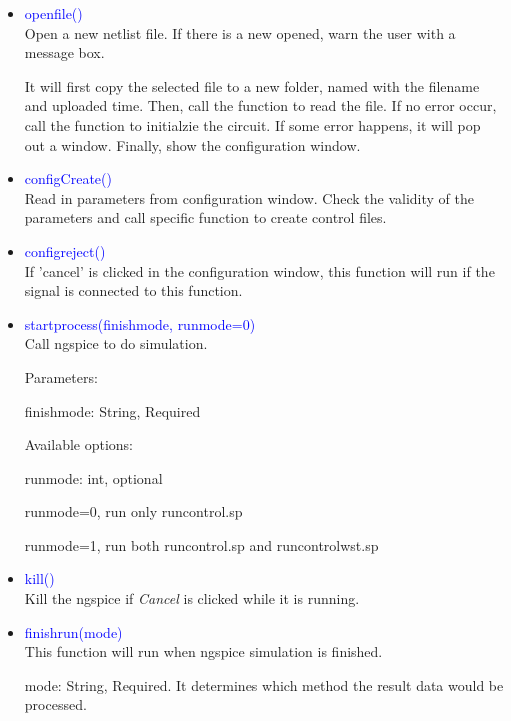 \documentclass[12pt,a4paper]{article}
\begin{document}
\begin{itemize}[leftmargin=*]
\begin{itemize}
    \item \textcolor{blue}{openfile()}\\
        Open a new netlist file. If there is a new opened, warn the user with a message box.

        It will first copy the selected file to a new folder, named with the filename and uploaded time. Then, call the function to read the file. If no error occur, call the function to initialzie the circuit. If some error happens, it will pop out a window. Finally, show the configuration window.

    \item \textcolor{blue}{configCreate()}\\
        Read in parameters from configuration window. Check the validity of the parameters and call specific function to create control files.

    \item \textcolor{blue}{configreject()}\\
        If 'cancel' is clicked in the configuration window, this function will run if the signal is connected to this function.

    \item \textcolor{blue}{start\textunderscore process(finishmode, runmode=0)}\\
        Call ngspice to do simulation.

        Parameters:

        \quad finishmode: String, Required

        \quad Available options:

        \quad runmode: int, optional

        \quad runmode=0, run only run\textunderscore control.sp

        \quad runmode=1, run both run\textunderscore control.sp and run\textunderscore control\textunderscore wst.sp

    \item \textcolor{blue}{kill()}\\
        Kill the ngspice if \textit{Cancel} is clicked while it is running.

    \item \textcolor{blue}{finishrun(mode)}\\
        This function will run when ngspice simulation is finished.

        mode: String, Required. It determines which method the result data would be processed.


\end{itemize}
\end{itemize}
\end{document}
